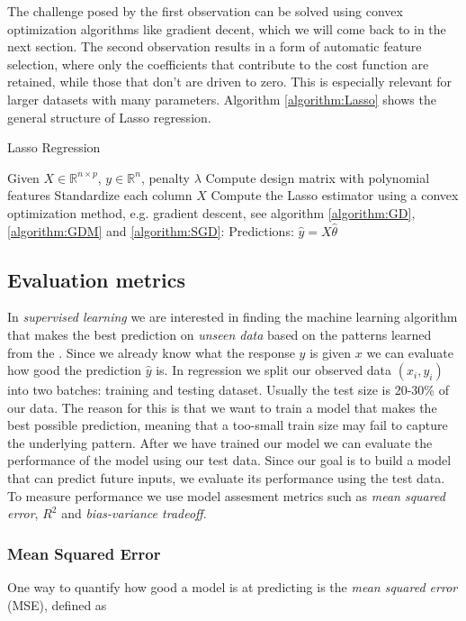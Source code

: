 \documentclass[amssymb,twocolumn,aps]{revtex4}
\begin{document}
The challenge posed by the first observation can be solved using convex optimization algorithms like gradient decent, which we will come back to in the next section. The second observation results in a form of automatic feature selection, where only the coefficients that contribute to the cost function are retained, while those that don't are driven to zero. This is especially relevant for larger datasets with many parameters. Algorithm \ref{algorithm:Lasso} shows the general structure of Lasso regression.

\begin{algorithm}[H]
    \caption{Lasso Regression}
    \label{algorithm:Lasso}
    \begin{algorithmic}[1]
        \State Given $X \in \mathbb{R}^{n \times p}$, $y \in \mathbb{R}^n$, penalty $\lambda$
        \State Compute design matrix with polynomial features
        \State Standardize each column $X$
        \State Compute the Lasso estimator using a convex optimization method, e.g. gradient descent, see algorithm \ref{algorithm:GD}, \ref{algorithm:GDM} and \ref{algorithm:SGD}:
        \State Predictions: $\hat{y} = X \hat{\theta}$
    \end{algorithmic}
\end{algorithm}


\subsection{Evaluation metrics}
In \textit{supervised learning} we are interested in finding the machine learning algorithm that makes the best prediction on \textit{unseen data} based on the patterns learned from the  \cite{fysml6}. Since we already know what the response $y$ is given $x$ we can evaluate how good the prediction $\hat{y}$ is. In regression we split our observed data $(x_i, y_i)$ into two batches: training and testing dataset. Usually the test size is 20-30\% of our data. The reason for this is that we want to train a model that makes the best possible prediction, meaning that a too-small train size may fail to capture the underlying pattern. After we have trained our model we can evaluate the performance of the model using our test data. Since our goal is to build a model that can predict future inputs, we evaluate its performance using the test data. To measure performance we use model assesment metrics such as \textit{mean squared error}, \textit{$R^2$} and \textit{bias-variance tradeoff}.

\subsubsection{Mean Squared Error}
One way to quantify how good a model is at predicting is the \textit{mean squared error} (MSE), defined as
\end{document}
